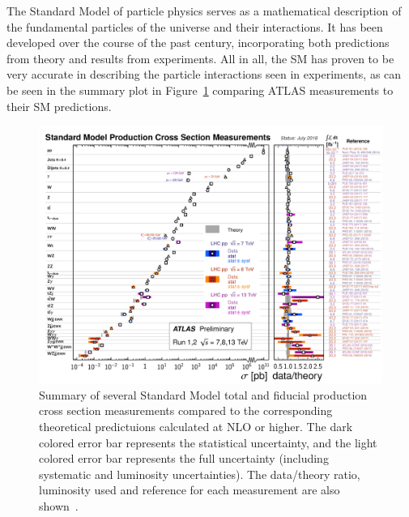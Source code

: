 ﻿The Standard Model of particle physics serves as a mathematical description of the fundamental particles of the universe and their interactions.
It has been developed over the course of the past century, incorporating both predictions from theory and results from experiments.
All in all, the SM has proven to be very accurate in describing the particle interactions seen in experiments, as can be seen in the summary plot in Figure~\ref{fig:theory_sm_meas} comparing ATLAS measurements to their SM predictions.

\begin{figure}
  \centering
  \includegraphics[width=\textwidth]{figs/theory/ATLAS_sm_measurements}
  \caption[Summary of several Standard Model total and fiducial production cross section measurements compared to the corresponding theoretical predictuions calculated at NLO or higher. The dark colored error bar represents the statistical uncertainty, and the light colored error bar represents the full uncertainty (including systematic and luminosity uncertainties). The data/theory ratio, luminosity used and reference for each measurement are also shown.]{Summary of several Standard Model total and fiducial production cross section measurements compared to the corresponding theoretical predictuions calculated at NLO or higher. The dark colored error bar represents the statistical uncertainty, and the light colored error bar represents the full uncertainty (including systematic and luminosity uncertainties). The data/theory ratio, luminosity used and reference for each measurement are also shown~\cite{2019.atlas-summary-plots}.}
  \label{fig:theory_sm_meas}
\end{figure}

